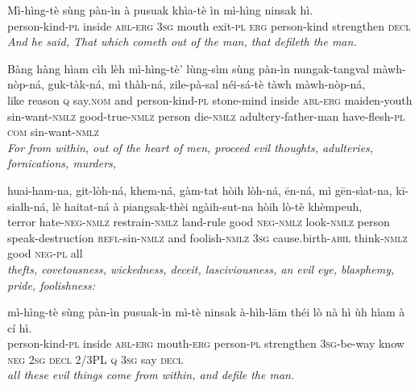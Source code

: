 \documentclass[11pt,a4paper]{article}
\begin{document}
\begin{exe}
\gll Mì-hìng-tè sùng pàn-ìn à pusuak khìa-tè ìn mì-hìng ninsak hì. \\
     person-kind-\textsc{pl} inside \textsc{abl}-\textsc{erg} \textsc{3sg} mouth exit-\textsc{pl} \textsc{erg} person-kind strengthen \textsc{decl} \\
\glt \textcolor{kjvcolor}{\textit{And he said, That which cometh out of the man, that defileth the man.}}

\gll Bàng hàng hìam cìh lèh mì-hìng-tè' lùng-sìm sùng pàn-ìn nungak-tangval màwh-nòp-ná, guk-tàk-ná, mì thàh-ná, zile-pà-sal néi-sá-tè tàwh màwh-nòp-ná, \\
     like reason \textsc{q} say.\textsc{nom} and person-kind-\textsc{pl} stone-mind inside \textsc{abl}-\textsc{erg} maiden-youth sin-want-\textsc{nmlz} good-true-\textsc{nmlz} person die-\textsc{nmlz} adultery-father-man have-flesh-\textsc{pl} \textsc{com} sin-want-\textsc{nmlz} \\
\glt \textcolor{kjvcolor}{\textit{For from within, out of the heart of men, proceed evil thoughts, adulteries, fornications, murders,}}

\gll huai-ham-na, git-lòh-ná, khem-ná, gàm-tat hòih lòh-ná, ēn-ná, mì gēn-sìat-na, kī-sialh-ná, lè haitat-ná à piangsak-thèi ngàih-sut-na hòih lò-tè khèmpeuh, \\
     terror hate-\textsc{neg}-\textsc{nmlz} restrain-\textsc{nmlz} land-rule good \textsc{neg}-\textsc{nmlz} look-\textsc{nmlz} person speak-destruction \textsc{refl}-sin-\textsc{nmlz} and foolish-\textsc{nmlz} \textsc{3sg} cause.birth-\textsc{abil} think-\textsc{nmlz} good \textsc{neg}-\textsc{pl} all \\
\glt \textcolor{kjvcolor}{\textit{thefts, covetousness, wickedness, deceit, lasciviousness, an evil eye, blasphemy, pride, foolishness:}}

\gll mì-hìng-tè sùng pàn-ìn pusuak-ìn mì-tè ninsak à-hìh-lām théi lò nà hì ùh hìam à cí hì. \\
     person-kind-\textsc{pl} inside \textsc{abl}-\textsc{erg} mouth-\textsc{erg} person-\textsc{pl} strengthen \textsc{3sg}-be-way know \textsc{neg} \textsc{2sg} \textsc{decl} 2/3PL \textsc{q} \textsc{3sg} say \textsc{decl} \\
\glt \textcolor{kjvcolor}{\textit{all these evil things come from within, and defile the man.}}


\end{exe}
\end{document}
